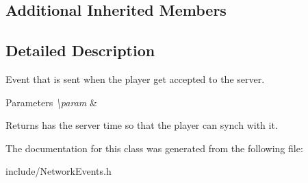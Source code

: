 \subsection*{Additional Inherited Members}


\subsection{Detailed Description}
Event that is sent when the player get accepted to the server. 


\begin{DoxyParams}{Parameters}
{\em \textbackslash{}param} & \\
\hline
\end{DoxyParams}
\begin{DoxyReturn}{Returns}
has the server time so that the player can synch with it. 
\end{DoxyReturn}


The documentation for this class was generated from the following file\-:\begin{DoxyCompactItemize}
\item 
include/Network\-Events.\-h\end{DoxyCompactItemize}
